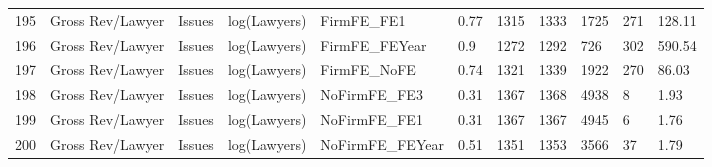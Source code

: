 \documentclass{article}
\begin{document}
\begin{table}[H]
\begin{tabular}{rllllllllll}
  195 & Gross Rev/Lawyer & Issues & log(Lawyers) & FirmFE\_FE1 & 0.77 & 1315 & 1333 & 1725 & 271 & 128.11 \\ 
  196 & Gross Rev/Lawyer & Issues & log(Lawyers) & FirmFE\_FEYear & 0.9 & 1272 & 1292 & 726 & 302 & 590.54 \\ 
  197 & Gross Rev/Lawyer & Issues & log(Lawyers) & FirmFE\_NoFE & 0.74 & 1321 & 1339 & 1922 & 270 & 86.03 \\ 
  198 & Gross Rev/Lawyer & Issues & log(Lawyers) & NoFirmFE\_FE3 & 0.31 & 1367 & 1368 & 4938 & 8 & 1.93 \\ 
  199 & Gross Rev/Lawyer & Issues & log(Lawyers) & NoFirmFE\_FE1 & 0.31 & 1367 & 1367 & 4945 & 6 & 1.76 \\ 
  200 & Gross Rev/Lawyer & Issues & log(Lawyers) & NoFirmFE\_FEYear & 0.51 & 1351 & 1353 & 3566 & 37 & 1.79 \\ 
   \hline
\end{tabular}
\end{table}
\end{document}
